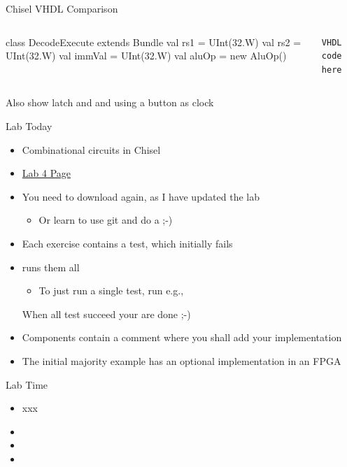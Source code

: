 \begin{frame}[fragile]{Chisel VHDL Comparison}
\begin{columns}
\begin{chisel}
class DecodeExecute extends Bundle {
  val rs1 = UInt(32.W)
  val rs2 = UInt(32.W)
  val immVal = UInt(32.W)
  val aluOp = new AluOp()
}
\end{chisel}
\begin{verbatim}
VHDL code here
\end{verbatim}
\end{columns}
Also show latch and and using a button as clock
\end{frame}

\begin{frame}[fragile]{Lab Today}
\begin{itemize}
\item Combinational circuits in Chisel
\item \href{https://github.com/schoeberl/chisel-lab/tree/master/lab4}{Lab 4 Page}
\item You need to download again, as I have updated the lab
\begin{itemize}
\item Or learn to use git and do a   ;-)
\end{itemize}
\item Each exercise contains a test, which initially fails
\item {} runs them all
\begin{itemize}
\item To just run a single test, run e.g.,\\
\end{itemize}
When all test succeed your are done ;-)
\item Components contain a comment where you shall add your implementation
\item The initial majority example has an optional implementation in an FPGA
\end{itemize}
\end{frame}

\begin{frame}[fragile]{Lab Time}
\begin{itemize}
\item xxx
\item
\item
\item
\end{itemize}
\end{frame}

